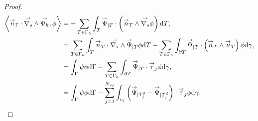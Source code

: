 \begin{proof}
    \begin{align*}
        \left< \vn_\Gamma \cdot \vrots \vect{\Psi_h}, \phi \right>
        & = - \sum_{T\in\Gamma_h} \int_T \vect{\Psi}_{|T}  \cdot \left( \vn_T \pvect \vgrads \phi \right) \dd{T}, \\
        & = \sum_{T\in\Gamma_h} \int_T \vn_T \cdot \vrots \vect{\Psi}_{|T} \phi \dd{T} - \sum_{T\in\Gamma_h} \int_{\partial T}  \vect{\Psi}_{|T} \cdot \left(\vn_T \pvect \vect{\nu}_T \right)\phi\dd{\gamma},\\
        & = \int_\Gamma \psi \phi \dd{\Gamma} - \sum_{T\in\Gamma_h} \int_{\partial T}  \vect{\Psi}_{|T} \cdot \vect{\tau}_j \phi\dd{\gamma},\\
        &= \int_\Gamma \psi \phi \dd{\Gamma} - \sum_{j=1}^{N_{vj}} \int_{v_j}  \left(\vect{\Psi}_{|T_j^g} - \vect{\Psi}_{|T_j^d} \right) \cdot \vect{\tau}_j \phi\dd{\gamma}.
    \end{align*}
\end{proof}
